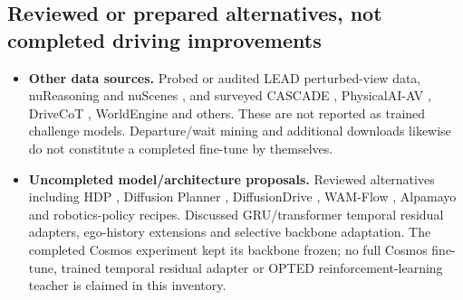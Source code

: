 \subsection{Reviewed or prepared alternatives, not completed driving improvements}
\begin{itemize}\setlength{\itemsep}{3pt}\setlength{\parsep}{0pt}\setlength{\parskip}{0pt}\setlength{\topsep}{3pt}
\item \textbf{Other data sources.} Probed or audited LEAD \cite{lead} perturbed-view data, nuReasoning \cite{nureasoning} and nuScenes \cite{nuscenes}, and surveyed CASCADE \cite{cascade}, PhysicalAI-AV \cite{nvidiadata}, DriveCoT \cite{drivecot}, WorldEngine \cite{worldengine} and others. These are not reported as trained challenge models. Departure/wait mining and additional downloads likewise do not constitute a completed fine-tune by themselves.
\item \textbf{Uncompleted model/architecture proposals.} Reviewed alternatives including HDP \cite{hdp}, Diffusion Planner \cite{diffplanner}, DiffusionDrive \cite{diffusiondrive}, WAM-Flow \cite{wamflow}, Alpamayo \cite{alpamayo} and robotics-policy recipes. Discussed GRU/transformer temporal residual adapters, ego-history extensions and selective backbone adaptation. The completed Cosmos experiment kept its backbone frozen; no full Cosmos fine-tune, trained temporal residual adapter or OPTED \cite{opted} reinforcement-learning teacher is claimed in this inventory.
\end{itemize}

\endgroup
